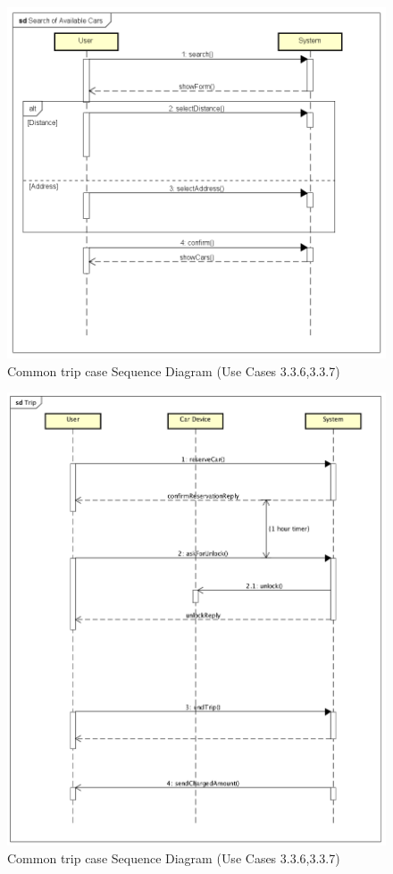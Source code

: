 \begin{figure}[H]
	\centering
	\includegraphics[width = \textwidth]{img/sequence4}
	\caption{Common trip case Sequence Diagram (Use Cases 3.3.6,3.3.7)}
\end{figure}

\begin{figure}[H]
	\centering
	\includegraphics[width = \textwidth]{img/sequence_trip}
	\caption{Common trip case Sequence Diagram (Use Cases 3.3.6,3.3.7)}
\end{figure}




